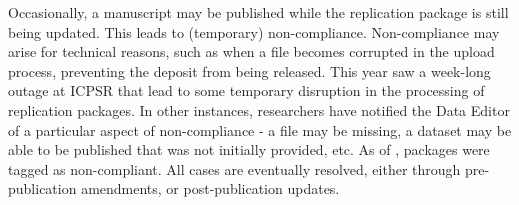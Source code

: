 Occasionally, a manuscript may be published while the replication package is still being updated. This leads to (temporary) non-compliance. Non-compliance may arise for technical reasons, such as when a file becomes corrupted in the upload process, preventing the deposit from being released. This year saw a week-long outage at ICPSR that lead to some temporary disruption in the processing of replication packages. In other instances, researchers have notified the Data Editor of a particular aspect of non-compliance - a file may be missing, a dataset may be able to be published that was not initially provided, etc. 
As of \lastday{}, \mcpubnoncompl{} packages were tagged as non-compliant.
All cases are eventually resolved, either through pre-publication amendments, or post-publication updates.%


    

 



